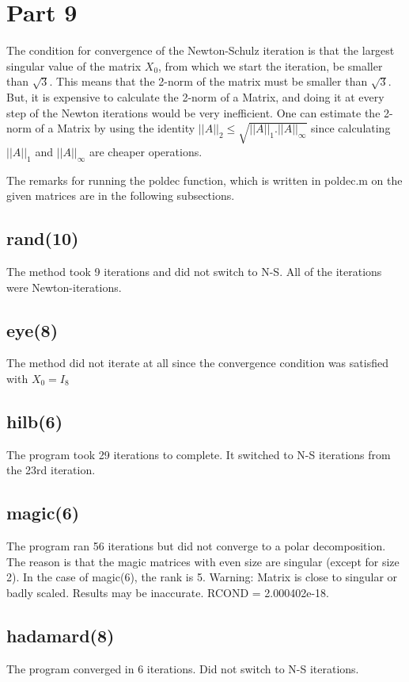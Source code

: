 \documentclass{article}
\begin{document}
\section{Part 9}
\begin{flushleft}

The condition for convergence of the Newton-Schulz iteration is that the largest singular value of the matrix $X_0$, from which we start the iteration, be smaller than $\sqrt{3}$. This means that the 2-norm of the matrix must be smaller than $\sqrt{3}$. But, it is expensive to calculate the 2-norm of a Matrix, and doing it at every step of the Newton iterations would be very inefficient. One can estimate the 2-norm of a Matrix by using the identity $||A||_2 \leq \sqrt{||A||_1 . ||A||_\infty}$ since calculating $||A||_1$ and $||A||_\infty$ are cheaper operations.

The remarks for running the poldec function, which is written in poldec.m on the given matrices are in the following subsections.

\subsection{rand(10)}
The method took 9 iterations and did not switch to N-S. All of the iterations were Newton-iterations.
\subsection{eye(8)}
The method did not iterate at all since the convergence condition was satisfied with $X_0 = I_8$
\subsection{hilb(6)}
The program took 29 iterations to complete. It switched to N-S iterations from the 23rd iteration.
\subsection{magic(6)}
The program ran 56 iterations but did not converge to a polar decomposition. The reason is that the magic matrices with even size are singular (except for size 2). In the case of magic(6), the rank is 5.
Warning: Matrix is close to singular or badly scaled. Results may be inaccurate. RCOND =  2.000402e-18.
\subsection{hadamard(8)}
The program converged in 6 iterations. Did not switch to N-S iterations.

\end{flushleft}
\end{document}
